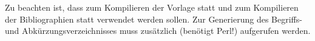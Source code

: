 Zu beachten ist, dass zum Kompilieren der Vorlage
 statt 
und zum Kompilieren der Bibliographien
 statt 
verwendet werden sollen.
Zur Generierung des Begriffs- und Abkürzungsverzeichnisses muss zusätzlich
 (benötigt Perl!) aufgerufen werden.